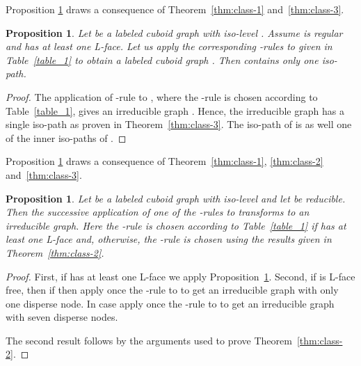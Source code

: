 \documentclass[a4paper,11pt]{article}
\newtheorem{proposition}[theorem]{Proposition}
\begin{document}
Proposition \ref{prop:class-5} draws a consequence of Theorem~\ref{thm:class-1} and~\ref{thm:class-3}.
\begin{proposition}Let  be a labeled cuboid graph with iso-level .
Assume  is regular and has at least one L-face. Let us apply the corresponding -rules to  given
in Table~\ref{table_1} to obtain a labeled cuboid graph . Then  contains only one
iso-path.
\label{prop:class-5}
\end{proposition}
\begin{proof}
The application of -rule to , where the -rule is chosen according to Table~\ref{table_1},
gives an irreducible graph . Hence, the irreducible graph  has a single iso-path as proven in
Theorem~\ref{thm:class-3}. The iso-path of  is as well one of the inner iso-paths of .
\end{proof}

Proposition \ref{prop:class-6} draws a consequence of Theorem~\ref{thm:class-1}, \ref{thm:class-2}
and~\ref{thm:class-3}.
\begin{proposition}Let  be a labeled cuboid graph with iso-level  and let
 be reducible. Then the successive application of one of the -rules to  transforms 
to an irreducible graph. Here the -rule is chosen according to Table~\ref{table_1} if  has at
least one L-face and, otherwise, the -rule is chosen using the results given in Theorem~\ref{thm:class-2}.
\label{prop:class-6}
\end{proposition}
\begin{proof} First, if  has at least one L-face we apply
Proposition~\ref{prop:class-5}. Second, if  is L-face free, then if  then apply once the
-rule to  to get an irreducible graph  with only one disperse node. In case 
apply once the -rule to  to get an irreducible graph  with seven disperse nodes.

The second result follows by the arguments used to prove Theorem~\ref{thm:class-2}.
\end{proof}
\end{document}
